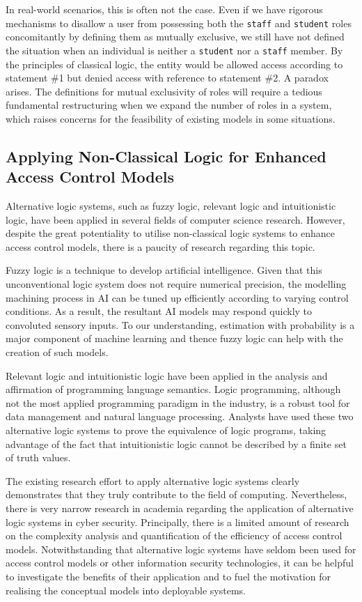 \documentclass{article}
\begin{document}
In real-world scenarios, this is often not the case. Even if we have rigorous
mechanisms to disallow a user from possessing both the \texttt{staff} and
\texttt{student} roles concomitantly by defining them as mutually exclusive,
we still have not defined the situation when an individual is neither a
\texttt{student} nor a \texttt{staff} member. By the principles of classical
logic, the entity would be allowed access according to statement \#1 but denied
access with reference to statement \#2. A paradox arises. The definitions for
mutual exclusivity of roles will require a tedious fundamental restructuring
when we expand the number of roles in a system, which raises concerns for
the feasibility of existing models in some situations.

\subsection{Applying Non-Classical Logic for Enhanced Access Control Models}

Alternative logic systems, such as fuzzy logic, relevant logic and
intuitionistic logic, have been applied in several fields of computer science
research. However, despite the great potentiality to utilise non-classical
logic systems to enhance access control models, there is a paucity of research
regarding this topic.

Fuzzy logic is a technique to develop artificial intelligence. Given that
this unconventional logic system does not require numerical precision, the
modelling machining process in AI can be tuned up efficiently according
to varying control conditions. As a result, the resultant AI models may
respond quickly to convoluted sensory inputs.\cite{fuzzy-logic-ai} To our
understanding, estimation with probability is a major component of machine
learning and thence fuzzy logic can help with the creation of such models.

Relevant logic and intuitionistic logic have been applied in the analysis and
affirmation of programming language semantics. Logic programming, although
not the most applied programming paradigm in the industry, is a robust tool
for data management and natural language processing. Analysts have used these
two alternative logic systems to prove the equivalence of logic programs,
taking advantage of the fact that intuitionistic logic cannot be described
by a finite set of truth values.\cite{logic-programs}

The existing research effort to apply alternative logic systems
clearly demonstrates that they truly contribute to the field of
computing. Nevertheless, there is very narrow research in academia regarding
the application of alternative logic systems in cyber security. Principally,
there is a limited amount of research on the complexity analysis and
quantification of the efficiency of access control models. Notwithstanding
that alternative logic systems have seldom been used for access control
models or other information security technologies, it can be helpful to
investigate the benefits of their application and to fuel the motivation
for realising the conceptual models into deployable systems.
\end{document}
